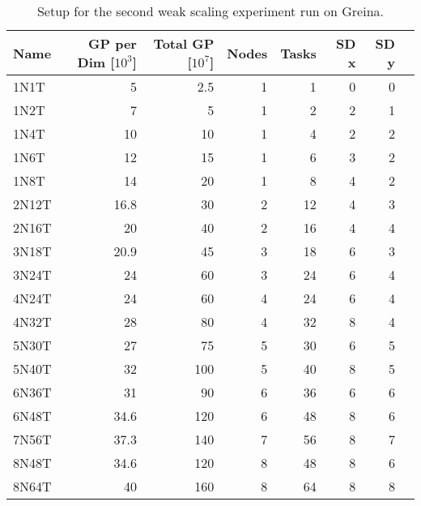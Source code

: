 \begin{table}[!htbp]
\centering
{}
\begin{tabular}{l r r r r r r r}
\toprule
Name & GP per Dim [$10^3$] & Total GP [$10^7$] & Nodes & Tasks & SD x & SD y \\
\midrule
1N1T	&	5	&	2.5	&	1	&	1	&	0	&	0	\\
1N2T	&	7	&	5	&	1	&	2	&	2	&	1	\\
1N4T	&	10	&	10	&	1	&	4	&	2	&	2	\\
1N6T	&	12	&	15	&	1	&	6	&	3	&	2	\\
1N8T	&	14	&	20	&	1	&	8	&	4	&	2	\\
2N12T	&	16.8	&	30	&	2	&	12	&	4	&	3	\\
2N16T	&	20	&	40	&	2	&	16	&	4	&	4	\\
3N18T	&	20.9	&	45	&	3	&	18	&	6	&	3	\\
3N24T	&	24	&	60	&	3	&	24	&	6	&	4	\\
4N24T	&	24	&	60	&	4	&	24	&	6	&	4	\\
4N32T	&	28	&	80	&	4	&	32	&	8	&	4	\\
5N30T	&	27	&	75	&	5	&	30	&	6	&	5	\\
5N40T	&	32	&	100	&	5	&	40	&	8	&	5	\\
6N36T	&	31	&	90	&	6	&	36	&	6	&	6	\\
6N48T	&	34.6	&	120	&	6	&	48	&	8	&	6	\\
7N56T	&	37.3	&	140	&	7	&	56	&	8	&	7	\\
8N48T	&	34.6	&	120	&	8	&	48	&	8	&	6	\\
8N64T	&	40	&	160	&	8	&	64	&	8	&	8	\\
\bottomrule
\end{tabular}
\caption{Setup for the second weak scaling experiment run on Greina.}
\label{tab:weak_5k}
\end{table}

